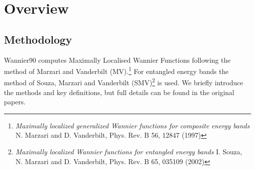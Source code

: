 \chapter{Overview}

\section{Methodology}
Wannier90 computes Maximally Localised
Wannier Functions following the method of Marzari and Vanderbilt (MV).\footnote{
{\it Maximally localized generalized Wannier functions for composite energy bands}
N. Marzari and D. Vanderbilt, Phys. Rev. B 56, 12847 (1997)}
For entangled energy bands  the method of
Souza, Marzari and Vanderbilt (SMV)\footnote{{\it Maximally localized
    Wannier functions for entangled energy bands} 
I. Souza, N. Marzari and D. Vanderbilt, Phys. Rev. B 65, 035109 (2002)}
is used.
We briefly introduce the methods and key definitions, but full details
can be found in the original papers. 

